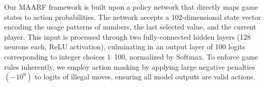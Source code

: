 \documentclass[twocolumn, a4paper]{article}
\begin{document}




Our MAARF framework is built upon a policy network that directly maps game states to action probabilities. The network accepts a 102-dimensional state vector encoding the usage patterns of numbers, the last selected value, and the current player. This input is processed through two fully-connected hidden layers (128 neurons each, ReLU activation), culminating in an output layer of 100 logits corresponding to integer choices 1--100, normalized by Softmax. To enforce game rules inherently, we employ action masking by applying large negative penalties $(-10^9)$ to logits of illegal moves, ensuring all model outputs are valid actions.
\end{document}
